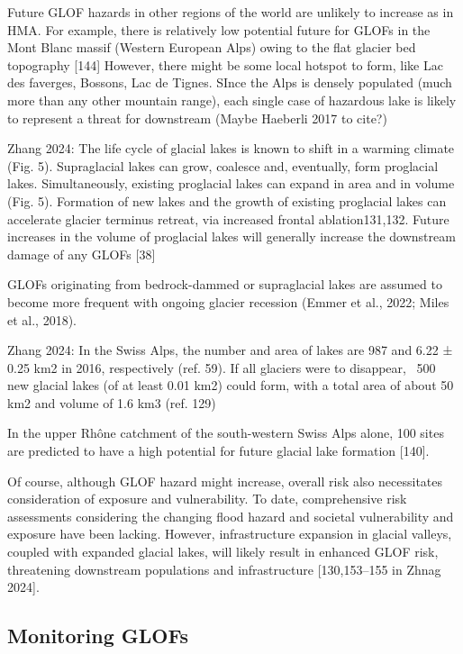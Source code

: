 Future GLOF hazards in other regions of the world are unlikely to increase as in HMA. For example, there is relatively low potential future for GLOFs in the Mont Blanc massif (Western European Alps) owing to the flat glacier bed topography [144]
However, there might be some local hotspot to form, like Lac des faverges, Bossons, Lac de Tignes. SInce the Alps is densely populated (much more than any other mountain range), each single case of hazardous lake is likely to represent a threat for downstream (Maybe Haeberli 2017 to cite?)


Zhang 2024: The life cycle of glacial lakes is known to shift in a warming climate (Fig. 5). Supraglacial lakes can grow, coalesce and, eventually, form proglacial lakes. Simultaneously, existing proglacial lakes can expand in area and in volume (Fig. 5). Formation of new lakes and the growth of existing proglacial lakes can accelerate glacier terminus retreat, via increased frontal ablation131,132. Future increases in the volume of proglacial lakes will generally increase the downstream damage of any GLOFs [38]



GLOFs originating from bedrock-dammed or supraglacial lakes are assumed to become more frequent with ongoing glacier recession (Emmer et al., 2022; Miles et al., 2018).

Zhang 2024: In the Swiss Alps, the number and area of lakes are 987 and 6.22 ± 0.25 km2 in 2016, respectively (ref. 59). If all glaciers were to disappear, ~500 new glacial lakes (of at least 0.01 km2) could form, with a total area of about 50 km2 and volume of 1.6 km3 (ref. 129)

In the upper Rhône catchment of the south-western Swiss Alps alone, 100 sites are predicted to have a high potential for future glacial lake formation [140].

Of course, although GLOF hazard might increase, overall risk also necessitates consideration of exposure and vulnerability. To date, comprehensive risk assessments considering the changing flood hazard and societal vulnerability and exposure have been lacking.
However, infrastructure expansion in glacial valleys, coupled with expanded glacial lakes, will likely result in enhanced GLOF risk, threatening downstream populations and infrastructure [130,153–155 in Zhnag 2024].



\subsection{Monitoring GLOFs}%

